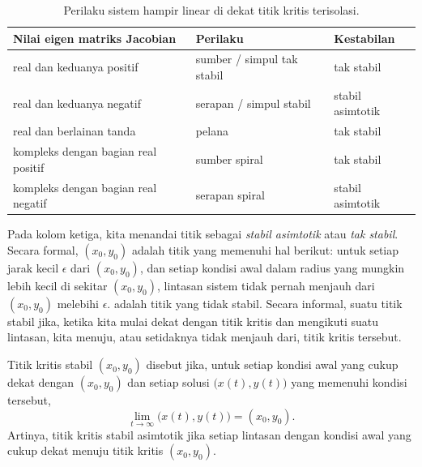 \begin{table}[h!t]
\mybeginframe
\capstart
\begin{center}
\begin{tabular}{@{}lll@{}}
\toprule
Nilai eigen matriks Jacobian & Perilaku & Kestabilan \\
\midrule
real dan keduanya positif & sumber / simpul tak stabil & tak stabil \\
real dan keduanya negatif & serapan / simpul stabil & stabil asimtotik \\
real dan berlainan tanda & pelana & tak stabil \\
kompleks dengan bagian real positif & sumber spiral & tak stabil \\
kompleks dengan bagian real negatif & serapan spiral & stabil asimtotik \\
\bottomrule
\end{tabular}
\end{center}
\caption{Perilaku sistem hampir linear di dekat titik kritis
terisolasi. \label{pln:behtab2}}
\myendframe
\end{table}

Pada kolom ketiga,
kita menandai titik sebagai \emph{stabil asimtotik} atau \emph{tak stabil}. Secara formal,
\emph{} $(x_0,y_0)$ adalah titik yang memenuhi hal berikut:
untuk setiap jarak kecil $\epsilon$ dari $(x_0,y_0)$, dan setiap kondisi awal
dalam radius yang mungkin lebih kecil di sekitar $(x_0,y_0)$, lintasan
sistem tidak pernah menjauh dari $(x_0,y_0)$ melebihi $\epsilon$.
\emph{} adalah titik yang tidak stabil.
Secara informal, suatu titik stabil jika, ketika kita mulai dekat dengan titik kritis dan
mengikuti suatu lintasan, kita menuju, atau setidaknya tidak menjauh
dari,
titik kritis tersebut.

Titik kritis stabil $(x_0,y_0)$ disebut \emph{} jika,
untuk setiap kondisi awal yang cukup dekat dengan $(x_0,y_0)$ dan setiap
solusi $\bigl( x(t), y(t) \bigr)$ yang memenuhi kondisi tersebut,
\begin{equation*}
\lim_{t \to \infty} \bigl( x(t), y(t) \bigr) = (x_0,y_0) .
\end{equation*}
Artinya, titik kritis stabil asimtotik
jika setiap lintasan dengan kondisi awal yang cukup dekat
menuju titik kritis $(x_0,y_0)$.

